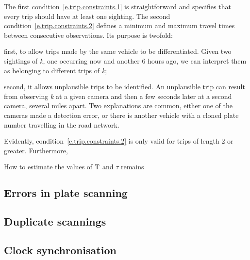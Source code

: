 The first condition~\ref{e.trip.constraints.1} is straightforward and specifies that every trip should have at least one sighting. The second condition~\ref{e.trip.constraints.2} defines a minimum and maximum travel times between consecutive observations. Its purpose is twofold:
\begin{enumerate*}[label=(\roman*)]
  \item first, to allow trips made by the same vehicle to be differentiated. Given two sightings of \emph{k}, one occurring now and another 6 hours ago, we can interpret them as belonging to different trips of \emph{k};%
  \item second, it allows unplausible trips to be identified. An unplausible trip can result from observing \emph{k} at a given camera and then a few seconds later at a second camera, several miles apart. Two explanations are common, either one of the cameras made a detection error, or there is another vehicle with a cloned plate number travelling in the road network.
\end{enumerate*}

Evidently, condition~\ref{e.trip.constraints.2} is only valid for trips of length 2 or greater. Furthermore,

How to estimate the values of $\mathrm{T}$ and $\tau$ remains

%
%
%

\subsection{Errors in plate scanning}

\subsection{Duplicate scannings}

\subsection{Clock synchronisation}



